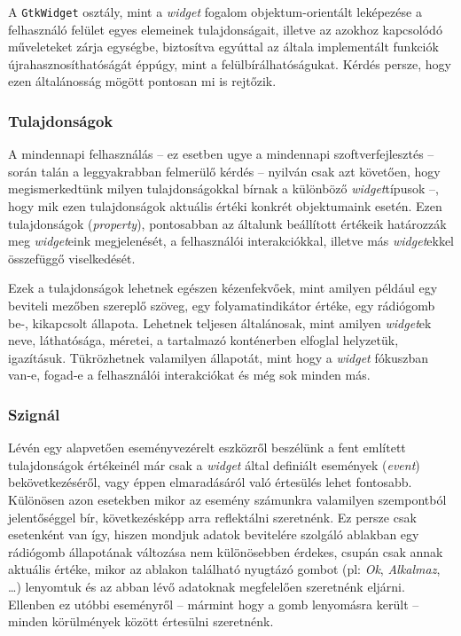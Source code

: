 A \texttt{GtkWidget} osztály, mint a \textit{widget} fogalom objektum-orientált leképezése a felhasználó felület egyes elemeinek tulajdonságait, illetve az azokhoz kapcsolódó műveleteket zárja egységbe, biztosítva egyúttal az általa implementált funkciók újrahasznosíthatóságát éppúgy, mint a felülbírálhatóságukat. Kérdés persze, hogy ezen általánosság mögött pontosan mi is rejtőzik.

\subsubsection{Tulajdonságok}

A mindennapi felhasználás -- ez esetben ugye a mindennapi szoftverfejlesztés -- során talán a leggyakrabban felmerülő kérdés -- nyilván csak azt követően, hogy megismerkedtünk milyen tulajdonságokkal bírnak a különböző \textit{widget}típusok --, hogy mik ezen tulajdonságok aktuális értéki konkrét objektumaink esetén. Ezen tulajdonságok (\textit{property}), pontosabban az általunk beállított értékeik határozzák meg \textit{widget}eink megjelenését, a felhasználói interakciókkal, illetve más \textit{widget}ekkel összefüggő viselkedését.

Ezek a tulajdonságok lehetnek egészen kézenfekvőek, mint amilyen például egy beviteli mezőben szereplő szöveg, egy folyamatindikátor értéke, egy rádiógomb be-, kikapcsolt állapota. Lehetnek teljesen általánosak, mint amilyen \textit{widget}ek neve, láthatósága, méretei, a tartalmazó konténerben elfoglal helyzetük, igazításuk. Tükrözhetnek valamilyen állapotát, mint hogy a \textit{widget} fókuszban van-e, fogad-e a felhasználói interakciókat és még sok minden más.

\subsubsection{Szignál}

Lévén egy alapvetően eseményvezérelt eszközről beszélünk a fent említett tulajdonságok értékeinél már csak a \textit{widget} által definiált események (\textit{event}) bekövetkezéséről, vagy éppen elmaradásáról való értesülés lehet fontosabb. Különösen azon esetekben mikor az esemény számunkra valamilyen szempontból jelentőséggel bír, következésképp arra reflektálni szeretnénk. Ez persze csak esetenként van így, hiszen mondjuk adatok bevitelére szolgáló ablakban egy rádiógomb állapotának változása nem különösebben érdekes, csupán csak annak aktuális értéke, mikor az ablakon található nyugtázó gombot (pl: \textit{Ok}, \textit{Alkalmaz}, \dots) lenyomtuk és az abban lévő adatoknak megfelelően szeretnénk eljárni. Ellenben ez utóbbi eseményről -- mármint hogy a gomb lenyomásra került -- minden körülmények között értesülni szeretnénk.

